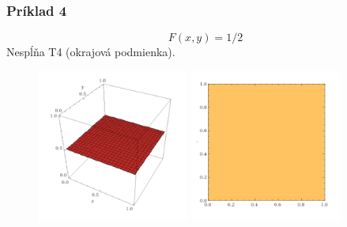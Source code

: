 \documentclass{beamer}
\begin{document}
\begin{frame}
\frametitle{Príklad 4}
$$ F(x,y)=1/2$$
Nespĺňa T4 (okrajová podmienka).
\begin{figure}
\includegraphics[width=5cm]{function12}
\includegraphics[width=5cm]{function122}
\end{figure}
\end{frame}

\end{document}
